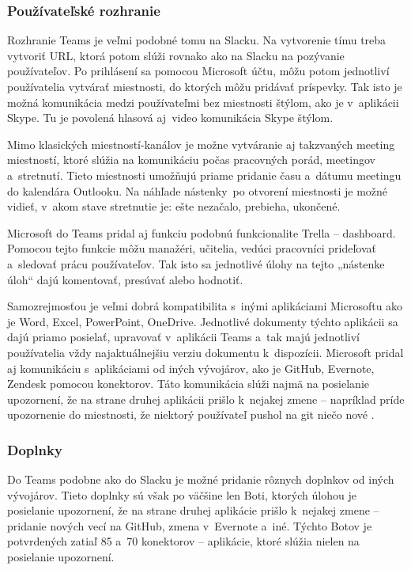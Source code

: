 \subsubsection{Používateľské rozhranie}
\indent Rozhranie Teams je veľmi podobné tomu na Slacku. Na vytvorenie tímu treba vytvoriť URL, ktorá potom slúži rovnako ako na Slacku na pozývanie používateľov. Po prihlásení sa pomocou Microsoft účtu, môžu potom jednotliví používatelia vytvárať miestnosti, do ktorých môžu pridávať príspevky. Tak isto je možná komunikácia medzi používateľmi bez miestnosti štýlom, ako je v aplikácii Skype. Tu je povolená hlasová aj video komunikácia Skype štýlom. 

\indent Mimo klasických miestností-kanálov je možne vytváranie aj takzvaných meeting miestností, ktoré slúžia na komunikáciu počas pracovných porád, meetingov a stretnutí. Tieto miestnosti umožňujú priame pridanie času a dátumu meetingu do kalendára Outlooku. Na náhľade nástenky po otvorení miestnosti je možné vidieť, v akom stave stretnutie je: ešte nezačalo, prebieha, ukončené. 

\indent Microsoft do Teams pridal aj funkciu podobnú funkcionalite Trella – dashboard. Pomocou tejto funkcie môžu manažéri, učitelia, vedúci pracovníci prideľovať a sledovať prácu používateľov. Tak isto sa jednotlivé úlohy na tejto „nástenke úloh“ dajú komentovať, presúvať alebo hodnotiť.

\indent Samozrejmosťou je veľmi dobrá kompatibilita s inými aplikáciami Microsoftu ako je Word, Excel, PowerPoint, OneDrive. Jednotlivé dokumenty týchto aplikácii sa dajú priamo posielať, upravovať v aplikácii Teams a tak majú jednotliví používatelia vždy najaktuálnejšiu verziu dokumentu k dispozícii. Microsoft pridal aj komunikáciu s aplikáciami od iných vývojárov, ako je GitHub, Evernote, Zendesk pomocou konektorov. Táto komunikácia slúži najmä na posielanie upozornení, že na strane druhej aplikácii prišlo k nejakej zmene – napríklad príde upozornenie do miestnosti, že niektorý používateľ pushol na git niečo nové \cite{ms_teams}.  
\subsubsection{Doplnky}
\indent Do Teams podobne ako do Slacku je možné pridanie rôznych doplnkov od iných vývojárov. Tieto doplnky sú však po väčšine len Boti, ktorých úlohou je posielanie upozornení, že na strane druhej aplikácie prišlo k nejakej zmene – pridanie nových vecí na GitHub, zmena v Evernote a iné. Týchto Botov je potvrdených zatiaľ 85 a 70 konektorov – aplikácie, ktoré slúžia nielen na posielanie upozornení. 
